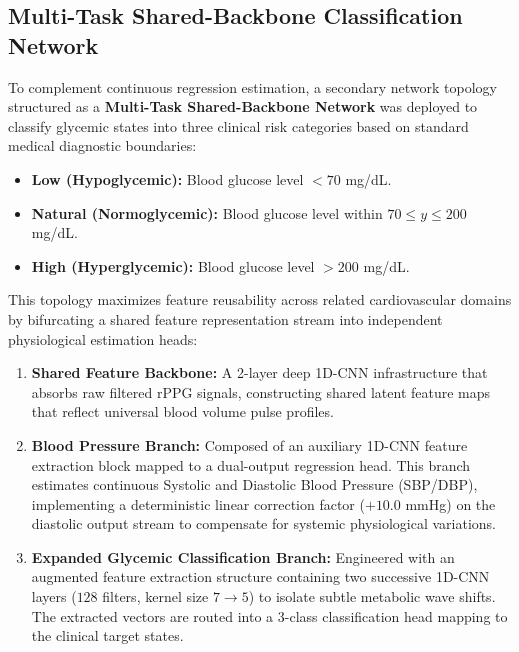 \subsection{Multi-Task Shared-Backbone Classification Network}
To complement continuous regression estimation, a secondary network topology structured as a \textbf{Multi-Task Shared-Backbone Network} was deployed to classify glycemic states into three clinical risk categories based on standard medical diagnostic boundaries:
\begin{itemize}
    \item \textbf{Low (Hypoglycemic):} Blood glucose level $< 70$ mg/dL.
    \item \textbf{Natural (Normoglycemic):} Blood glucose level within $70 \le y \le 200$ mg/dL.
    \item \textbf{High (Hyperglycemic):} Blood glucose level $> 200$ mg/dL.
\end{itemize}

This topology maximizes feature reusability across related cardiovascular domains by bifurcating a shared feature representation stream into independent physiological estimation heads:

\begin{enumerate}
    \item \textbf{Shared Feature Backbone:} A 2-layer deep 1D-CNN infrastructure that absorbs raw filtered rPPG signals, constructing shared latent feature maps that reflect universal blood volume pulse profiles.
    \item \textbf{Blood Pressure Branch:} Composed of an auxiliary 1D-CNN feature extraction block mapped to a dual-output regression head. This branch estimates continuous Systolic and Diastolic Blood Pressure (SBP/DBP), implementing a deterministic linear correction factor ($+10.0$ mmHg) on the diastolic output stream to compensate for systemic physiological variations.
    \item \textbf{Expanded Glycemic Classification Branch:} Engineered with an augmented feature extraction structure containing two successive 1D-CNN layers ($128$ filters, kernel size $7 \to 5$) to isolate subtle metabolic wave shifts. The extracted vectors are routed into a 3-class classification head mapping to the clinical target states.
\end{enumerate}

